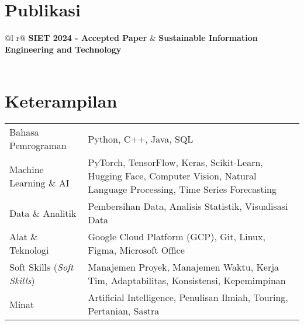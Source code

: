 \documentclass[a4paper,12pt]{article}
\begin{document}
\section{Publikasi}
\begin{tabularx}{\linewidth}{ @{}l r@{} }
\textbf{SIET 2024 - Accepted Paper} & \hfill \textbf{Sustainable Information Engineering and Technology} \\[3.75pt]
  \\
\end{tabularx}

\section{Keterampilan}
\begin{tabularx}{\linewidth}{@{}l X@{}}
Bahasa Pemrograman & \normalsize{Python, C++, Java, SQL}\\
Machine Learning \& AI & \normalsize{PyTorch, TensorFlow, Keras, Scikit-Learn, Hugging Face, Computer Vision, Natural Language Processing, Time Series Forecasting}\\
Data \& Analitik & \normalsize{Pembersihan Data, Analisis Statistik, Visualisasi Data}\\
Alat \& Teknologi & \normalsize{Google Cloud Platform (GCP), Git, Linux, Figma, Microsoft Office}\\
Soft Skills (\textit{Soft Skills}) & \normalsize{Manajemen Proyek, Manajemen Waktu, Kerja Tim, Adaptabilitas, Konsistensi, Kepemimpinan}\\
Minat & \normalsize{Artificial Intelligence, Penulisan Ilmiah, Touring, Pertanian, Sastra}\\
\end{tabularx}

\vfill
{}
\end{document}

